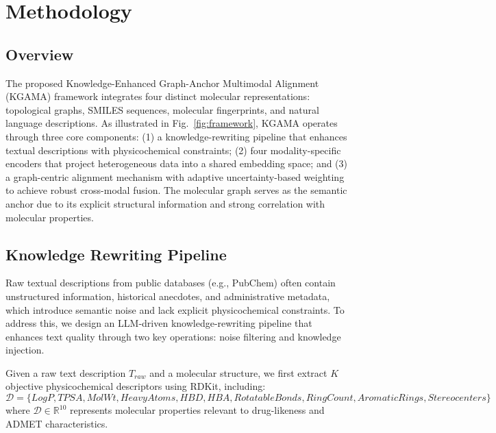 \documentclass[journal]{IEEEtran}
\begin{document}
\section{Methodology}
\label{sec:method}
\subsection{Overview}
The proposed Knowledge-Enhanced Graph-Anchor Multimodal Alignment (KGAMA) framework integrates four distinct molecular representations: topological graphs, SMILES sequences, molecular fingerprints, and natural language descriptions. As illustrated in Fig.~\ref{fig:framework}, KGAMA operates through three core components: (1) a knowledge-rewriting pipeline that enhances textual descriptions with physicochemical constraints; (2) four modality-specific encoders that project heterogeneous data into a shared embedding space; and (3) a graph-centric alignment mechanism with adaptive uncertainty-based weighting to achieve robust cross-modal fusion. The molecular graph serves as the semantic anchor due to its explicit structural information and strong correlation with molecular properties.


\subsection{Knowledge Rewriting Pipeline}
Raw textual descriptions from public databases (e.g., PubChem) often contain unstructured information, historical anecdotes, and administrative metadata, which introduce semantic noise and lack explicit physicochemical constraints. To address this, we design an LLM-driven knowledge-rewriting pipeline that enhances text quality through two key operations: noise filtering and knowledge injection.

Given a raw text description $T_{raw}$ and a molecular structure, we first extract $K$ objective physicochemical descriptors using RDKit, including:
\begin{equation}
\mathcal{D} = \{LogP, TPSA, MolWt, HeavyAtoms, HBD, HBA, RotatableBonds, RingCount, AromaticRings, Stereocenters\}
\end{equation}
where $\mathcal{D} \in \mathbb{R}^{10}$ represents molecular properties relevant to drug-likeness and ADMET characteristics.
\end{document}
